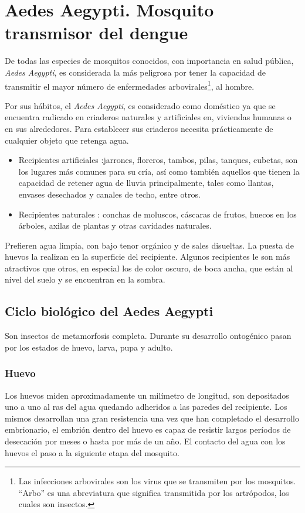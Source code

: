 
\section{Aedes Aegypti. Mosquito transmisor del dengue}
\label{sec:caracteristicas-biologicas}

De todas las especies de mosquitos conocidos, con importancia en salud pública, \textit{Aedes Aegypti},
es considerada la más peligrosa por tener la capacidad de transmitir el mayor número de enfermedades 
arbovirales\footnote{Las infecciones arbovirales son los virus que se transmiten por los mosquitos. 
“Arbo” es una abreviatura que significa transmitida por los artrópodos, los cuales son insectos.}, al 
hombre.\cite{ThironIzcazaJ2003}

Por sus hábitos, el \textit{Aedes Aegypti}, es considerado como doméstico ya que se encuentra radicado en
criaderos naturales y artificiales en, viviendas humanas o en sus alrededores. Para establecer sus criaderos
necesita prácticamente de cualquier objeto que retenga agua.

\begin{itemize}
    \item  Recipientes artificiales :jarrones, floreros, tambos, pilas, tanques, cubetas, son los lugares más
    comunes para su cría, así como también aquellos que tienen la capacidad de retener agua de lluvia
    principalmente, tales como llantas, envases desechados y canales de techo, entre otros.
    \item Recipientes naturales : conchas de moluscos, cáscaras de frutos, huecos en los árboles, axilas de
    plantas y otras cavidades naturales.
\end{itemize}

Prefieren agua limpia, con bajo tenor orgánico y de sales disueltas. La puesta de huevos la realizan en la
superficie del recipiente. Algunos recipientes le son más atractivos que otros, en especial los de color oscuro,
de boca ancha, que están al nivel del suelo y se encuentran en la sombra\cite{ThironIzcazaJ2003}.

\subsection{Ciclo biológico del Aedes Aegypti}
Son insectos de metamorfosis completa. Durante su desarrollo ontogénico pasan por los estados de huevo, larva,
pupa y adulto\cite{web-site:gMonteroBiologia}.

\subsubsection{Huevo}
\label{subsec:ciclo-biologico-huevo}
Los huevos miden aproximadamente un milímetro de longitud, son depositados uno a uno al ras del agua quedando
adheridos a las paredes del recipiente\cite{ThironIzcazaJ2003}. Los mismos desarrollan una gran resistencia una
vez que han completado el desarrollo embrionario, el embrión dentro del huevo es capaz de resistir largos 
períodos de desecación por meses o hasta por más de un año. El contacto del agua con los huevos el paso a la
siguiente etapa del mosquito.

